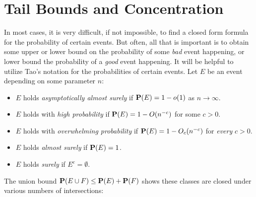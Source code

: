 \chapter{Tail Bounds and Concentration}

In most cases, it is very difficult, if not impossible, to find a closed form formula for the probability of certain events. But often, all that is important is to obtain some upper or lower bound on the probability of some \emph{bad} event happening, or lower bound the probability of a \emph{good} event happening. It will be helpful to utilize Tao's notation for the probabilities of certain events. Let $E$ be an event depending on some parameter $n$:
%
\begin{itemize}
    \item $E$ holds \emph{asymptotically almost surely} if $\operatorname{\mathbf{P}}(E) = 1 - o(1)$ as $n \to \infty$.
    \item $E$ holds with \emph{high probability} if $\mathbf{P}(E) = 1 - O(n^{-c})$ for some $c > 0$.
    \item $E$ holds with \emph{overwhelming probability} if $\mathbf{P}(E) = 1 - O_c(n^{-c})$ for \emph{every} $c > 0$.
    \item $E$ holds \emph{almost surely} if $\operatorname{\mathbf{P}}(E) = 1$.
    \item $E$ holds \emph{surely} if $E^c = \emptyset$.
\end{itemize}
%
The union bound $\mathbf{P}(E \cup F) \leq \mathbf{P}(E) + \mathbf{P}(F)$ shows these classes are closed under various numbers of intersections:
%
